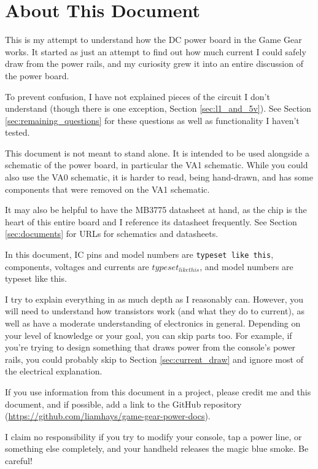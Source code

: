\documentclass{article}
\newcommand{\chippin}{\texttt}
\newcommand{\model}{\textsf}
\begin{document}
\frenchspacing %
\section{About This Document}
This is my attempt to understand how the DC power board in the Game
Gear works. It started as just an attempt to find out how much current
I could safely draw from the power rails, and my curiosity grew it
into an entire discussion of the power board.

To prevent confusion, I have not explained pieces of the circuit I
don't understand (though there is one exception, Section
\ref{sec:l1_and_5v}). See Section \ref{sec:remaining_questions} for
these questions as well as functionality I haven't tested.

This document is not meant to stand alone. It is intended to be used
alongside a schematic of the power board, in particular the
\model{VA1} schematic. While you could also use the \model{VA0}
schematic, it is harder to read, being hand-drawn, and has some
components that were removed on the \model{VA1} schematic.

It may also be helpful to have the \model{MB3775} datasheet at hand,
as the chip is the heart of this entire board and I reference its
datasheet frequently. See Section \ref{sec:documents} for URLs for
schematics and datasheets.

In this document, IC pins and model numbers are \chippin{typeset like
  this}, components, voltages and currents are $typeset_{like this}$,
and model numbers are \model{typeset like this}.

I try to explain everything in as much depth as I reasonably
can. However, you will need to understand how transistors work (and
what they do to current), as well as have a moderate understanding of
electronics in general. Depending on your level of knowledge or your
goal, you can skip parts too. For example, if you're trying to design
something that draws power from the console's power rails, you could
probably skip to Section \ref{sec:current_draw} and ignore most of the
electrical explanation.

If you use information from this document in a project, please credit
me and this document, and if possible, add a link to the GitHub
repository (\url{https://github.com/liamhays/game-gear-power-docs}).

I claim no responsibility if you try to modify your console, tap a
power line, or something else completely, and your handheld releases
the magic blue smoke. Be careful!
\end{document}
